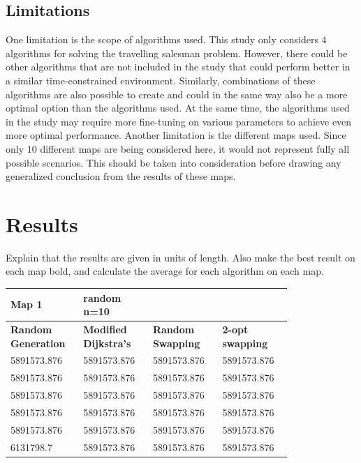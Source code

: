 \documentclass{article}
\begin{document}
\subsection{Limitations}\label{Limitations}
One limitation is the scope of algorithms used. This study only considers $4$ algorithms for solving the travelling salesman problem. However, there could be other algorithms that are not included in the study that could perform better in a similar time-constrained environment. Similarly, combinations of these algorithms are also possible to create and could in the same way also be a more optimal option than the algorithms used. 
\noindent
At the same time, the algorithms used in the study may require more fine-tuning on various parameters to achieve even more optimal performance. 
\noindent
Another limitation is the different maps used. Since only $10$ different maps are being considered here, it would not represent fully all possible scenarios. This should be taken into consideration before drawing any generalized conclusion from the results of these maps.


\section{Results}\label{Results}

Explain that the results are given in units of length. 
Also make the best result on each map bold, and calculate the average for each algorithm on each map.





\begin{table}[H]
    \centering
    \begin{tabular}{|p{0.2\linewidth}|p{0.2\linewidth}|p{0.2\linewidth}|p{0.2\linewidth}|}
    \hline
        \textbf{Map 1 } & random n=10 & ~ & ~ \\ \hline
        \textbf{Random Generation} & \textbf{Modified Dijkstra's} & \textbf{Random Swapping} & \textbf{2-opt swapping} \\ \hline
        5891573.876 & 5891573.876 & 5891573.876 & 5891573.876 \\ \hline
        5891573.876 & 5891573.876 & 5891573.876 & 5891573.876 \\ \hline
        5891573.876 & 5891573.876 & 5891573.876 & 5891573.876 \\ \hline
        5891573.876 & 5891573.876 & 5891573.876 & 5891573.876 \\ \hline
        5891573.876 & 5891573.876 & 5891573.876 & 5891573.876 \\ \hline
        6131798.7 & 5891573.876 & 5891573.876 & 5891573.876 \\ \hline
    \end{tabular}
\end{table}
\end{document}

